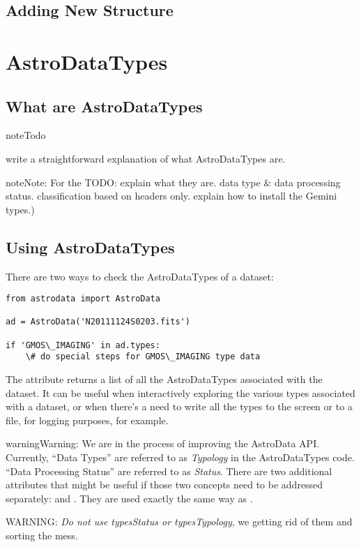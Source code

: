 \documentclass[letterpaper,10pt,english]{sphinxmanual}
\begin{document}
\section{Adding New Structure}
\label{structure:adding-new-structure}

\chapter{AstroDataTypes}
\label{types:astrodatatypes}\label{types::doc}\label{types:types}

\section{What are AstroDataTypes}
\label{types:what-are-astrodatatypes}
\begin{notice}{note}{Todo}

write a straightforward explanation of what AstroDataTypes are.
\end{notice}

\begin{notice}{note}{Note:}
For the TODO: explain what they are. data type \& data processing status.
classification based on headers only.  explain how to install the Gemini types.)
\end{notice}


\section{Using AstroDataTypes}
\label{types:using-astrodatatypes}
There are two ways to check the AstroDataTypes of a dataset:

\begin{Verbatim}[commandchars=\\\{\}]
from astrodata import AstroData

ad = AstroData('N20111124S0203.fits')

if 'GMOS\_IMAGING' in ad.types:
    \# do special steps for GMOS\_IMAGING type data
\end{Verbatim}

The attribute  returns a list of all the AstroDataTypes associated with the dataset.
It can be useful when interactively exploring the various types associated with a dataset, or
when there's a need to write all the types to the screen or to a file, for logging purposes, for example.

\begin{notice}{warning}{Warning:}
We are in the process of improving the AstroData API.  Currently,
``Data Types'' are referred to as \emph{Typology} in the AstroDataTypes code.  ``Data Processing Status''
are referred to as \emph{Status}.  There are two additional attributes that might be useful if those
two concepts need to be addressed separately:   and .
They are used exactly the same way as .

WARNING:  \emph{Do not use typesStatus or typesTypology}, we getting rid of them and sorting the mess.
\end{notice}
\end{document}
